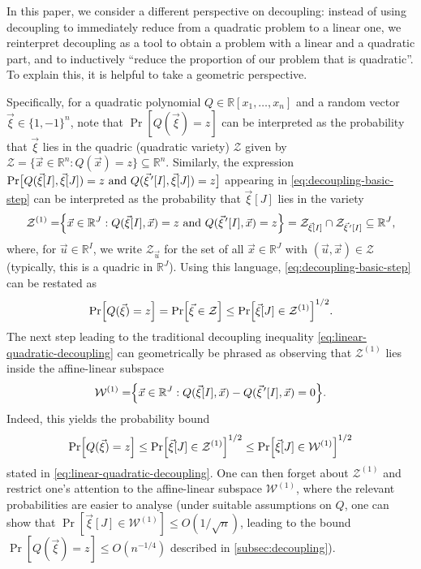 \documentclass[english]{article}
\theoremstyle{remark}
\numberwithin{equation}{section}
\numberwithin{figure}{section}
\newcommand{\pvec}[1]{\vec{#1}\mkern2mu\vphantom{#1}'}
\newcommand{\RR}{\mathbb{R}}
\newcommand{\mc}{\mathcal}
\begin{document}
In this paper, we consider a different perspective on decoupling: instead of using decoupling to immediately reduce from a quadratic problem to a linear one, we reinterpret decoupling as a tool to obtain a problem with a linear and a quadratic part, and to inductively ``reduce the proportion of our problem that is quadratic''. To explain this, it is helpful to take a geometric perspective.

Specifically, for a quadratic polynomial $Q\in \RR[x_1,\dots,x_n]$ and a random vector $\vec{\xi}\in \{1,-1\}^n$, note that $\Pr[Q(\vec \xi)=z]$ can be interpreted as the probability that $\vec \xi$ lies in the quadric (quadratic variety) $\mc Z$ given by $\mc Z=\{\vec x \in \RR^n: Q(\vec x)=z\}\subseteq\RR^n$. Similarly, the expression $\Pr\bigl[Q(\vec{\xi}[I],\vec{\xi}[J])=z\text{ and }Q(\pvec \xi[I],\vec{\xi}[J])=z\bigr]$ appearing in \cref{eq:decoupling-basic-step} can be interpreted as the probability that $\vec \xi[J]$ lies in the variety
\[\mc Z^{(1)}=\Bigr\{\vec x\in \RR^J: Q(\vec{\xi}[I],\vec x)=z\text{ and }Q(\pvec \xi[I],\vec x)=z\Bigr\}=\mathcal Z_{\vec \xi[I]}\cap \mathcal Z_{\pvec \xi[I]}\subseteq \RR^J,\]
where, for $\vec u\in \RR^I$, we write $\mathcal Z_{\vec u}$ for the set of all $\vec x\in \RR^J$ with $(\vec u,\vec x)\in \mc Z$ (typically, this is a quadric in $\RR^J$). Using this language, \cref{eq:decoupling-basic-step} can be restated as
\begin{equation}
\Pr\Bigl[Q(\vec \xi)=z\Bigr]=\Pr\Bigl[\vec \xi\in \mc Z\Bigr]\le \Pr\Bigl[\vec \xi[J]\in \mc Z^{(1)}\Bigr]^{1/2}.\label{eq:decoupling-restatement}
\end{equation}
The next step leading to the traditional decoupling inequality \cref{eq:linear-quadratic-decoupling} can geometrically be phrased as observing that $\mc Z^{(1)}$ lies inside the affine-linear subspace
\[\mc W^{(1)}=\Bigr\{\vec x \in \RR^J :Q(\vec{\xi}[I],\vec{x})-Q(\pvec \xi[I],\vec{x})=0\Bigr\}.\]
Indeed, this yields the probability bound
\[\Pr\Bigl[Q(\vec \xi)=z\Bigr]\le \Pr\Bigl[\vec \xi[J]\in \mc Z^{(1)}\Bigr]^{1/2}\le \Pr\Bigl[\vec \xi[J]\in \mc W^{(1)}\Bigr]^{1/2}\] stated in \cref{eq:linear-quadratic-decoupling}. 
One can then forget about $\mc Z^{(1)}$ and restrict one's attention to the affine-linear subspace $\mc W^{(1)}$, where the relevant probabilities are  easier to analyse (under suitable assumptions on $Q$,
one can show that $\Pr[\vec \xi[J]\in \mc W^{(1)}]\le O(1/\sqrt{n})$, leading to the bound $\Pr[Q(\vec \xi)=z]\le O(n^{-1/4})$ described in \cref{subsec:decoupling}).
\end{document}
